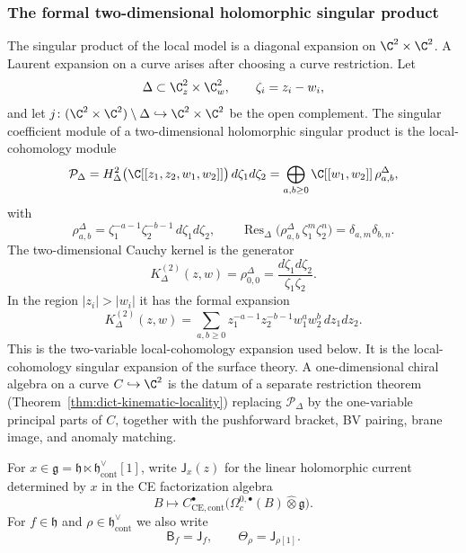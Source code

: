 \subsubsection{The formal two-dimensional holomorphic singular product}
\label{sssec:formal-two-dimensional-holomorphic-singular-product}

The singular product of the local model is a diagonal expansion on
\(\C^2\times\C^2\).  A Laurent expansion on a curve arises after
choosing a curve restriction.  Let
\[
  \Delta\subset \C^2_z\times\C^2_w,\qquad
  \zeta_i=z_i-w_i ,
\]
and let \(j\colon(\C^2\times\C^2)\setminus\Delta\hookrightarrow
\C^2\times\C^2\) be the open complement.  The singular coefficient
module of a two-dimensional holomorphic singular product is the local-cohomology
module
\[
  \mathcal P_\Delta
  =
  H^2_\Delta\bigl(\C[[z_1,z_2,w_1,w_2]]\bigr)\,d\zeta_1d\zeta_2
  =
  \bigoplus_{a,b\ge0}
  \C[[w_1,w_2]]\,\rho^\Delta_{a,b},
\]
with
\[
  \rho^\Delta_{a,b}
  =
  \zeta_1^{-a-1}\zeta_2^{-b-1}\,d\zeta_1d\zeta_2,\qquad
  \operatorname{Res}_\Delta\bigl(\rho^\Delta_{a,b}\,
  \zeta_1^m\zeta_2^n\bigr)=\delta_{a,m}\delta_{b,n}.
\]
The two-dimensional Cauchy kernel is the generator
\[
  K^{(2)}_\Delta(z,w)=\rho^\Delta_{0,0}
  =
  \frac{d\zeta_1d\zeta_2}{\zeta_1\zeta_2}.
\]
In the region \(|z_i|>|w_i|\) it has the formal expansion
\[
  K^{(2)}_\Delta(z,w)
  =
  \sum_{a,b\ge0}
  z_1^{-a-1}z_2^{-b-1}w_1^aw_2^b\,dz_1dz_2 .
\]
This is the two-variable local-cohomology expansion used below.  It
is the local-cohomology singular expansion of the surface theory.  A
one-dimensional chiral algebra on a curve \(C\hookrightarrow\C^2\)
is the datum of a separate restriction theorem
(Theorem~\ref{thm:dict-kinematic-locality}) replacing
\(\mathcal P_\Delta\) by the one-variable principal parts of \(C\),
together with the pushforward bracket, BV pairing, brane image, and
anomaly matching.

For \(x\in\mathfrak g=\mathfrak h\ltimes
 \mathfrak h^\vee_{\mathrm{cont}}[1]\), write \(\mathsf{J}_x(z)\) for
the linear holomorphic current determined by \(x\) in the CE
factorization algebra
\[
  B\longmapsto
  C^\bullet_{\mathrm{CE},\mathrm{cont}}
  \bigl(\Omega_c^{0,\bullet}(B)\widehat\otimes\mathfrak g\bigr).
\]
For \(f\in\mathfrak h\) and
\(\rho\in\mathfrak h^\vee_{\mathrm{cont}}\) we also write
\[
  \mathsf{B}_f=\mathsf{J}_f,\qquad
  \mathsf{\Theta}_\rho=\mathsf{J}_{\rho[1]} .
\]

